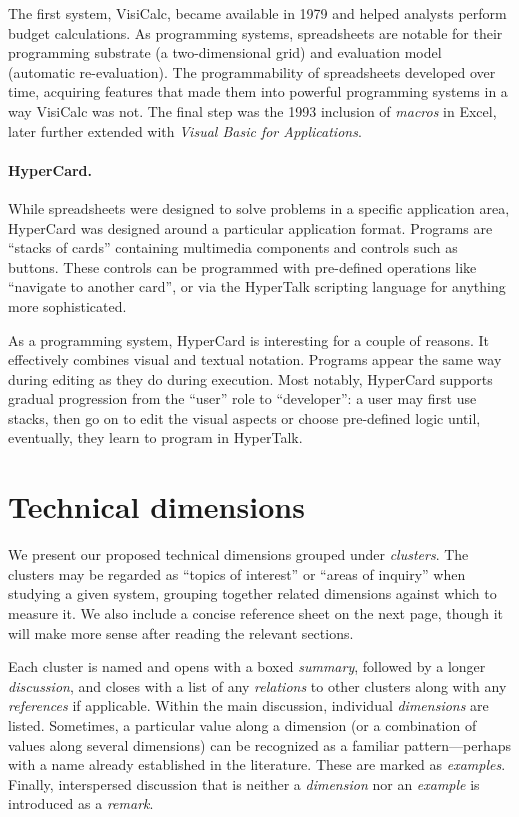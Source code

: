 The first system, VisiCalc, became available in 1979 and helped analysts
perform budget calculations. As programming systems, spreadsheets are
notable for their programming substrate (a two-dimensional grid) and
evaluation model (automatic re-evaluation). The programmability of
spreadsheets developed over time, acquiring features that made them into
powerful programming systems in a way VisiCalc was not. The final step
was the 1993 inclusion of \emph{macros} in Excel, later further extended
with \emph{Visual Basic for Applications}.

\paragraph{HyperCard.}

While spreadsheets were designed to solve problems in a specific
application area, HyperCard \cite{HyperCard} was designed around a
particular application format. Programs are ``stacks of cards''
containing multimedia components and controls such as buttons. These
controls can be programmed with pre-defined operations like ``navigate
to another card'', or via the HyperTalk scripting language for anything
more sophisticated.

As a programming system, HyperCard is interesting for a couple of
reasons. It effectively combines visual and textual notation. Programs
appear the same way during editing as they do during execution. Most
notably, HyperCard supports gradual progression from the ``user'' role
to ``developer'': a user may first use stacks, then go on to edit the
visual aspects or choose pre-defined logic until, eventually, they learn
to program in HyperTalk.

\hypertarget{technical-dimensions}{%
\section{Technical dimensions}\label{technical-dimensions}}

We present our proposed technical dimensions grouped under
\emph{clusters}. The clusters may be regarded as ``topics of interest''
or ``areas of inquiry'' when studying a given system, grouping together
related dimensions against which to measure it. We also include a
concise reference sheet on the next page, though it will make more sense
after reading the relevant sections.

Each cluster is named and opens with a boxed \emph{summary}, followed by
a longer \emph{discussion}, and closes with a list of any
\emph{relations} to other clusters along with any \emph{references} if
applicable. Within the main discussion, individual \emph{dimensions} are
listed. Sometimes, a particular value along a dimension (or a
combination of values along several dimensions) can be recognized as a
familiar pattern---perhaps with a name already established in the
literature. These are marked as \emph{examples}. Finally, interspersed
discussion that is neither a \emph{dimension} nor an \emph{example} is
introduced as a \emph{remark}.

